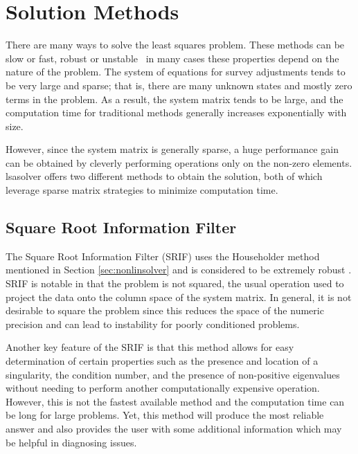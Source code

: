 \section{Solution Methods}
There are many ways to solve the least squares problem. These methods can be slow or fast,
robust or unstable \textemdash \ in many cases these properties depend on the nature of the problem.
The system of equations for survey adjustments tends to be very large 
and sparse; that is, there are many unknown states and mostly zero terms in 
the problem. As a result, the system matrix tends to be large, and
the computation time for traditional methods generally increases exponentially 
with size.

However, since the system matrix is generally sparse, a huge performance
gain can be obtained by cleverly performing operations only on the 
non-zero elements. \textsf{lsasolver} offers two different
methods to obtain the solution, both of which leverage sparse matrix 
strategies to minimize computation time.

\subsection{Square Root Information Filter}
The Square Root Information Filter (SRIF) uses the Householder method
mentioned in Section \ref{sec:nonlinsolver} and is considered to be extremely robust \cite{biermann}.
SRIF is notable in that the problem is not squared, the usual operation used 
to project the data onto the column space of the system matrix. 
In general, it is not desirable to square the problem since this 
reduces the space of the numeric precision and can lead to instability 
for poorly conditioned problems.

Another key feature of the SRIF is that this method allows for
easy determination of certain properties such as the presence and 
location of a singularity, the condition number, and the presence of
non-positive eigenvalues without needing to perform another 
computationally expensive operation. However, this is not the fastest available method and the
computation time can be long for large problems. Yet, this method will
produce the most reliable answer and also provides the user with some
additional information which may be helpful in diagnosing issues.

